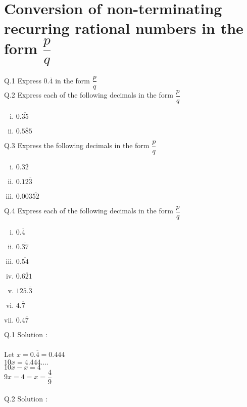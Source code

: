 \section{Conversion of non-terminating recurring rational numbers in
the form $\dfrac{p}{q}$}
Q.1 Express $0.\overline{4}$ in the form $\dfrac{p}{q}$\\
Q.2 Express each of the following decimals in the form $\dfrac{p}{q}$
\begin{multicols}{2}
\begin{enumerate}[(i)]
\item $0.\overline{35}$
\item $0.\overline{585}$
\end{enumerate}
\end{multicols}
\noindent Q.3 Express the following decimals in the form $\dfrac{p}{q}$
\begin{multicols}{3}
\begin{enumerate}[(i)]
\item $0.3\overline{2}$
\item $0.12\overline{3}$
\item $0.003\overline{52}$
\end{enumerate}
\end{multicols}
\noindent Q.4 Express each of the following decimals in the form $\dfrac{p}{q}$
\begin{multicols}{7}
\begin{enumerate}[(i)]
\item $0.\overline{4}$
\item $0.\overline{37}$
\item $0.\overline{54}$
\item $0.\overline{621}$
\item $125.\overline{3}$
\item $4.\overline{7}$
\item $0.4\overline{7}$
\end{enumerate}
\end{multicols}
\vspace{10mm}
\noindent Q.1 Solution :\\\\
Let $x = 0.\overline{4} = 0.444$\\
$10x = 4.444....$\\
$10x-x = 4$\\
$9x  = 4 = x = \dfrac{4}{9}$\\\\
Q.2 Solution :\\\\
